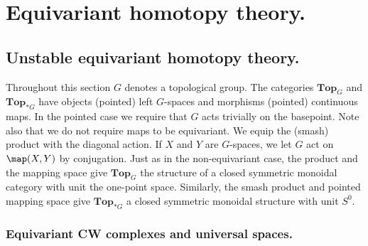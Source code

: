 \chapter{Equivariant homotopy theory.}
\section{Unstable equivariant homotopy theory.}
Throughout this section $G$ denotes a topological group. The categories
$\mathbf{Top}_G$ and $\mathbf{Top}_{\ast G}$ have objects
(pointed) left $G$-spaces and morphisms (pointed) continuous
maps. In the pointed case we require that $G$ acts trivially on
the basepoint. Note also that we do not require maps to be equivariant.
We equip the (smash) product with the diagonal action. If $X$ and $Y$ are
$G$-spaces, we let $G$ act on $\map(X,Y)$ by conjugation. Just as in the
non-equivariant case, the product and the mapping space
give $\mathbf{Top}_G$ the structure of a closed symmetric monoidal
category with unit the one-point space. Similarly, the smash product
and pointed mapping space give $\mathbf{Top}_{\ast G}$
a closed symmetric monoidal structure with unit $S^0$.

\subsection{Equivariant CW complexes and universal spaces.}


